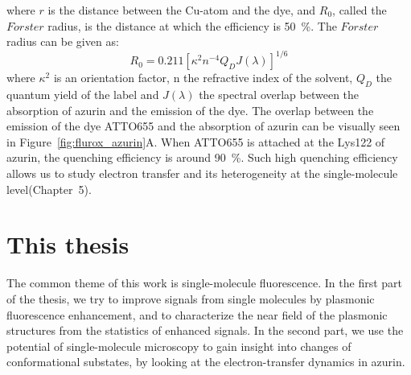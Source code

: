 where $r$ is the distance between the Cu-atom and the dye, and $R_0$, called the $F\ddot{o}rster$ radius, is the distance at which the efficiency is \SI{50}{\percent}.
The $F\ddot{o}rster$ radius can be given as:
\begin{equation}
	R_0 = 0.211[\kappa^2n^{-4}Q_DJ(\lambda)]^{1/6}	
\end{equation}
where $\kappa^2$ is an orientation factor, n the refractive index of the solvent, $Q_D$ the quantum yield of the label and $J(\lambda)$ the spectral overlap between the absorption of azurin and the emission of the dye.
The overlap between the emission of the dye ATTO655 and the absorption of azurin can be visually seen in Figure~\ref{fig:flurox_azurin}A.
When ATTO655 is attached at the Lys122 of azurin, the quenching efficiency is around \SI{90}{\percent}.
Such high quenching efficiency allows us to study electron transfer and its heterogeneity at the single-molecule level(Chapter~5).

\section{This thesis}
The common theme of this work is single-molecule fluorescence. In the first part of the thesis, we try to improve signals from single molecules by plasmonic fluorescence enhancement, and to characterize the near field of the plasmonic structures from the statistics of enhanced signals. In the second part, we use the potential of single-molecule microscopy to gain insight into changes of conformational substates, by looking at the electron-transfer dynamics in azurin.

